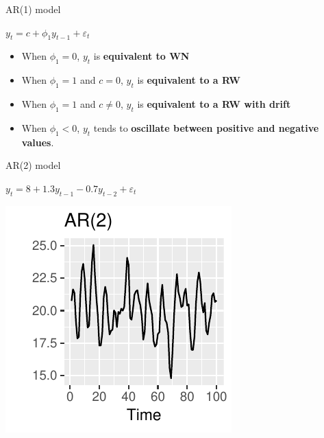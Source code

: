 \documentclass[14pt,ignorenonframetext,]{beamer}
\providecommand{\tightlist}{%
  \setlength{\itemsep}{0pt}\setlength{\parskip}{0pt}}
\begin{document}
\begin{frame}{AR(1) model}

\begin{block}{}
\centerline{$y_{t}    =   c + \phi_1 y_{t - 1}  +  \varepsilon_{t}$}
\end{block}

\begin{itemize}
\tightlist
\item
  When \(\phi_1=0\), \(y_t\) is \textbf{equivalent to WN}
\item
  When \(\phi_1=1\) and \(c=0\), \(y_t\) is \textbf{equivalent to a RW}
\item
  When \(\phi_1=1\) and \(c\ne0\), \(y_t\) is \textbf{equivalent to a RW
  with drift}
\item
  When \(\phi_1<0\), \(y_t\) tends to \textbf{oscillate between positive
  and negative values}.
\end{itemize}

\end{frame}

\begin{frame}{AR(2) model}

\begin{block}{}
\centerline{$y_t = 8 + 1.3y_{t-1} - 0.7 y_{t-2} + \varepsilon_t$}
\end{block}


\includegraphics[width=0.5\linewidth]{week_5_arima_files/figure-beamer/unnamed-chunk-21-1}

\end{frame}
\end{document}
